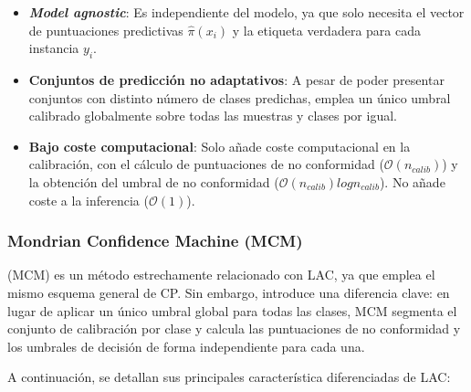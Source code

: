 \begin{itemize}

    \item \textbf{\textit{Model agnostic}}: Es independiente del modelo, ya que solo necesita el vector de puntuaciones predictivas $\hat{\pi}(x_i)$ y la etiqueta verdadera para cada instancia $y_i$.  

    \item \textbf{Conjuntos de predicción no adaptativos}: A pesar de poder presentar conjuntos con distinto número de clases predichas, emplea un único umbral calibrado globalmente sobre todas las muestras y clases por igual. 

    \item \textbf{Bajo coste computacional}: Solo añade coste computacional en la calibración, con el cálculo de puntuaciones de no conformidad ($\mathcal{O}(n_{calib})$) y la obtención del umbral de no conformidad ($\mathcal{O}(n_{calib})log n_{calib}$). No añade coste a la inferencia ($\mathcal{O}(1)$).
    
\end{itemize}



\subsubsection{Mondrian Confidence Machine (MCM)}

(MCM) \cite{vovk2003} es un método estrechamente relacionado con LAC, ya que emplea el mismo esquema general de CP. Sin embargo, introduce una diferencia clave: en lugar de aplicar un único umbral global para todas las clases, MCM segmenta el conjunto de calibración por clase y calcula las puntuaciones de no conformidad y los umbrales de decisión de forma independiente para cada una.

A continuación, se detallan sus principales característica diferenciadas de LAC:

